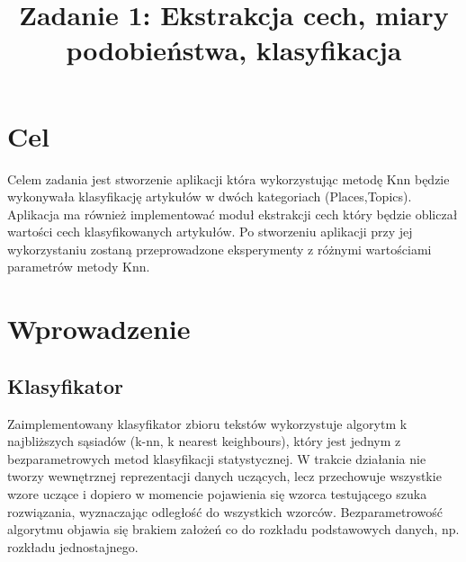 \documentclass{classrep}
\author{
  \studentinfo{Sebastian Kaźmierski}{216795} \and
  \studentinfo{Bartosz Paluszkiewicz}{216856} 
}
\title{Zadanie 1: Ekstrakcja cech, miary podobieństwa, klasyfikacja}
\begin{document}
\maketitle

\section{Cel}
{
Celem zadania jest stworzenie aplikacji która wykorzystując metodę Knn będzie wykonywała klasyfikację artykułów w dwóch kategoriach (Places,Topics). Aplikacja ma również implementować moduł ekstrakcji cech który będzie obliczał wartości cech klasyfikowanych artykułów. Po stworzeniu aplikacji przy jej wykorzystaniu zostaną przeprowadzone eksperymenty z różnymi wartościami parametrów metody Knn.}

\section{Wprowadzenie}
\subsection{Klasyfikator}
Zaimplementowany klasyfikator zbioru tekstów wykorzystuje algorytm k najbliższych sąsiadów (k-nn, k nearest keighbours), który jest jednym z bezparametrowych metod klasyfikacji statystycznej.\newline
W trakcie działania nie tworzy wewnętrznej reprezentacji danych uczących, lecz przechowuje wszystkie wzore uczące i dopiero w momencie pojawienia się wzorca testującego szuka rozwiązania, wyznaczając odległość do wszystkich wzorców.\newline
Bezparametrowość algorytmu objawia się brakiem założeń co do rozkładu podstawowych danych, np. rozkładu jednostajnego.\newline\newline
\end{document}
